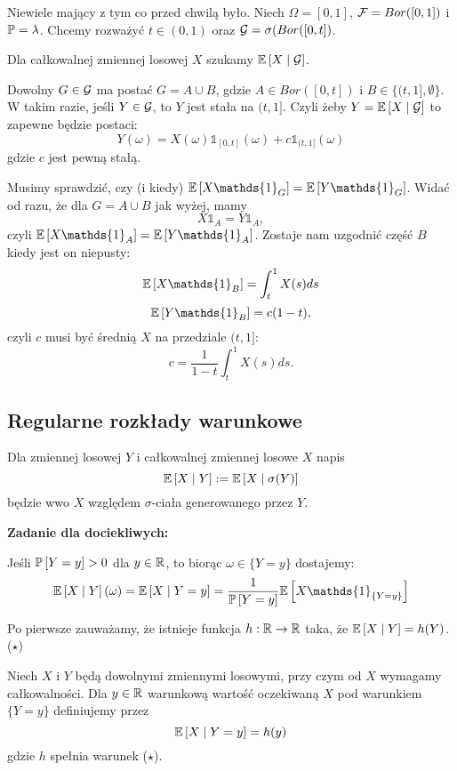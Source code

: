 \begin{example}
  \item Niewiele mający z tym co przed chwilą było. Niech $\Omega=[0,1]$, $\mathcal{F}=Bor([0,1])$ i $\prob=\lambda$. Chcemy rozważyć $t\in(0,1)$ oraz $\mathcal{G}=\sigma(Bor([0,t])$.

    Dla całkowalnej zmiennej losowej $X$ szukamy $\expected{X}{\set{G}}$.

    Dowolny $G\in\mathcal{G}$ ma postać $G=A\cup B$, gdzie $A\in Bor([0, t])$ i $B\in \{(t, 1],\emptyset\}$. W takim razie, jeśli $Y\in \mathcal{G}$, to $Y$ jest stała na $(t, 1]$. Czyli żeby $Y=\expected{X}{\set{G}}$ to zapewne będzie postaci:
    $$Y(\omega)=X(\omega)\mathds{1}_{[0, t]}(\omega)+c\mathds{1}_{(t, 1]}(\omega)$$
      gdzie $c$ jest pewną stałą.

      Musimy sprawdzić, czy (i kiedy) $\expected{X\mathds{1}_G}=\expected{Y\mathds{1}_{G}}$. Widać od razu, że dla $G=A\cup B$ jak wyżej, mamy
      $$X\mathds{1}_A=Y\mathds{1}_A,$$
      czyli $\expected{X\mathds{1}_A}=\expected{Y\mathds{1}_A}$. Zostaje nam uzgodnić część $B$ kiedy jest on niepusty:
      $$\expected{X\mathds{1}_B}=\int_t^1X(s)ds$$
      $$\expected{Y\mathds{1}_B}=c(1-t),$$
      czyli $c$ musi być średnią $X$ na przedziale $(t, 1]$:
      $$c=\frac{1}{1-t}\int_t^1X(s)ds.$$
\end{example}

\subsection{Regularne rozkłady warunkowe}

Dla zmiennej losowej $Y$ i całkowalnej zmiennej losowe $X$ napis
$$\expected{X}{Y}:=\expected{X}{\sigma(Y)}$$
będzie wwo $X$ względem $\sigma$-ciała generowanego przez $Y$.


\textbf{Zadanie dla dociekliwych:}

Jeśli $\prob{Y=y}>0$ dla $y\in\operatorname{\mathbb{R}}$, to biorąc $\omega\in\{Y=y\}$ dostajemy:
$$\expected{X}{Y}(\omega)=\expected{X}{Y=y}=\frac{1}{\prob{Y=y}}\expected{X\mathds{1}_{\{Y=y\}}}$$

\begin{definition}[wwo $X$ pod warunkiem $\{Y=y\}$]
 Po pierwsze zauważamy, że istnieje funkcja $h:\operatorname{\mathbb{R}}\to\operatorname{\mathbb{R}}$ taka, że $\expected{X}{Y}=h(Y)$. ($\star$)

  Niech $X$ i $Y$ będą dowolnymi zmiennymi losowymi, przy czym od $X$ wymagamy całkowalności. Dla $y\in\operatorname{\mathbb{R}}$ warunkową wartość oczekiwaną $X$ pod warunkiem $\{Y=y\}$ definiujemy przez 
  $$\expected{X}{Y=y}=h(y)$$
  gdzie $h$ spełnia warunek ($\star$).
\end{definition}

